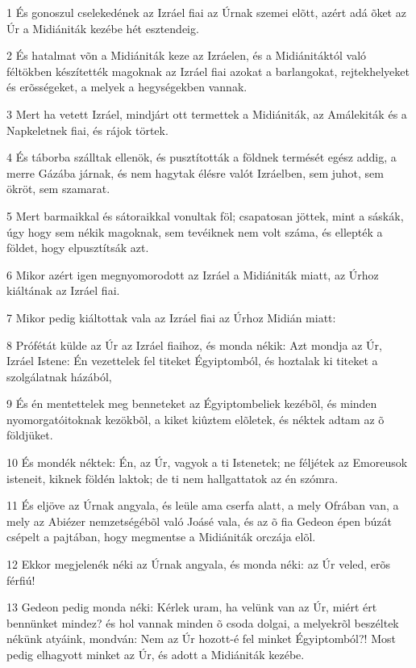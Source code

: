 \par 1 És gonoszul cselekedének az Izráel fiai az Úrnak szemei elõtt, azért adá õket az Úr a Midiániták kezébe hét esztendeig.
\par 2 És hatalmat võn a Midiániták keze az Izráelen, és a Midiánitáktól való féltökben készítették magoknak az Izráel fiai azokat a barlangokat, rejtekhelyeket és erõsségeket, a melyek a hegységekben vannak.
\par 3 Mert ha vetett Izráel, mindjárt ott termettek a Midiániták, az Amálekiták és a Napkeletnek fiai, és rájok törtek.
\par 4 És táborba szálltak ellenök, és pusztították a földnek termését egész addig, a merre Gázába járnak, és nem hagytak élésre valót Izráelben, sem juhot, sem ökröt, sem szamarat.
\par 5 Mert barmaikkal és sátoraikkal vonultak föl; csapatosan jöttek, mint a sáskák, úgy hogy sem nékik magoknak, sem tevéiknek nem volt száma, és ellepték a földet, hogy elpusztítsák azt.
\par 6 Mikor azért igen megnyomorodott az Izráel a Midiániták miatt, az Úrhoz kiáltának az Izráel fiai.
\par 7 Mikor pedig kiáltottak vala az Izráel fiai az Úrhoz Midián miatt:
\par 8 Prófétát külde az Úr az Izráel fiaihoz, és monda nékik: Azt mondja az Úr, Izráel Istene: Én vezettelek fel titeket Égyiptomból, és hoztalak ki titeket a szolgálatnak házából,
\par 9 És én mentettelek meg benneteket az Égyiptombeliek kezébõl, és minden nyomorgatóitoknak kezökbõl, a kiket kiûztem elõletek, és néktek adtam az õ földjüket.
\par 10 És mondék néktek: Én, az Úr, vagyok a ti Istenetek; ne féljétek az Emoreusok isteneit, kiknek földén laktok; de ti nem hallgattatok az én szómra.
\par 11 És eljöve az Úrnak angyala, és leüle ama cserfa alatt, a mely Ofrában van, a mely az Abiézer nemzetségébõl való Joásé vala, és az õ fia Gedeon épen búzát csépelt a pajtában, hogy megmentse a Midiániták orczája elõl.
\par 12 Ekkor megjelenék néki az Úrnak angyala, és monda néki: az Úr veled, erõs férfiú!
\par 13 Gedeon pedig monda néki: Kérlek uram, ha velünk van az Úr, miért ért bennünket mindez? és hol vannak minden õ csoda dolgai, a melyekrõl beszéltek nékünk atyáink, mondván: Nem az Úr hozott-é fel minket Égyiptomból?! Most pedig elhagyott minket az Úr, és adott a Midiániták kezébe.
